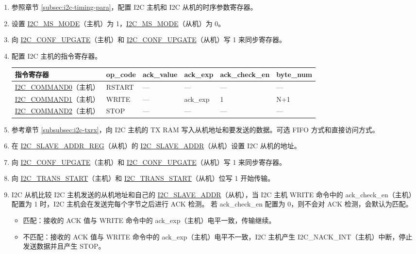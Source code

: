 \documentclass[main\_\_CN.tex]{subfiles}
\begin{document}
\begin{enumerate}
\item 参照章节 \ref{subsec:i2c-timing-para}，配置 I2C 主机和 I2C 从机的时序参数寄存器。
\item 设置 \hyperref[fielddesc:I2CMSMODE]{I2C\_MS\_MODE}（主机）为 1，\hyperref[fielddesc:I2CMSMODE]{I2C\_MS\_MODE}（从机）为 0。
\item 向 \hyperref[fielddesc:I2CCONFUPGATE]{I2C\_CONF\_UPGATE}（主机）和 \hyperref[fielddesc:I2CCONFUPGATE]{I2C\_CONF\_UPGATE}（从机）写 1 来同步寄存器。
\item 配置 I2C 主机的指令寄存器。

\begin{longtable}{ | p{4cm} | p{2cm} | p{2cm} | p{2cm} |p{2cm} | p{2cm} |}
\hline\rowcolor{lightgray}
指令寄存器& op\_code & ack\_value&ack\_exp&ack\_check\_en&byte\_num  \\ \hline
\hyperref[fielddesc:I2CCOMMAND0]{I2C\_COMMAND0}（主机）& RSTART& ---&---&---&---  \\ \hline
\hyperref[fielddesc:I2CCOMMAND1]{I2C\_COMMAND1}（主机）& WRITE& ---&ack\_exp&1&N+1  \\ \hline
\hyperref[fielddesc:I2CCOMMAND2]{I2C\_COMMAND2}（主机）& STOP& ---&---&---&---  \\ \hline
\end{longtable}

\item 参考章节 \ref{subsubsec:i2c-txrx}，向 I2C 主机的 TX RAM 写入从机地址和要发送的数据。可选 FIFO 方式和直接访问方式。
\item 在 \hyperref[regdesc:I2CSLAVEADDRREG]{I2C\_SLAVE\_ADDR\_REG}（从机）的 \hyperref[fielddesc:I2CSLAVEADDR]{I2C\_SLAVE\_ADDR}（从机）设置 I2C 从机的地址。
\item 向 \hyperref[fielddesc:I2CCONFUPGATE]{I2C\_CONF\_UPGATE}（主机）和 \hyperref[fielddesc:I2CCONFUPGATE]{I2C\_CONF\_UPGATE}（从机）写 1 来同步寄存器。
\item 向 \hyperref[fielddesc:I2CTRANSSTART]{I2C\_TRANS\_START}（主机）和 \hyperref[fielddesc:I2CTRANSSTART]{I2C\_TRANS\_START}（从机）位写 1 开始传输。
\item I2C 从机比较 I2C 主机发送的从机地址和自己的 \hyperref[fielddesc:I2CSLAVEADDR]{I2C\_SLAVE\_ADDR}（从机），当 I2C 主机 WRITE 命令中的 ack\_check\_en（主机）配置为 1 时，I2C 主机会在发送完每个字节之后进行 ACK 检测。 若 ack\_check\_en 配置为 0，则不会对 ACK 检测，会默认为匹配。

\begin{itemize}
\item 匹配：接收的 ACK 值与 WRITE 命令中的 ack\_exp（主机）电平一致，传输继续。
\item 不匹配：接收的 ACK 值与 WRITE 命令中的 ack\_exp（主机）电平不一致，I2C 主机产生 I2C\_NACK\_INT（主机）中断，停止发送数据并且产生 STOP。
\end{itemize}


\end{enumerate}
\end{document}
